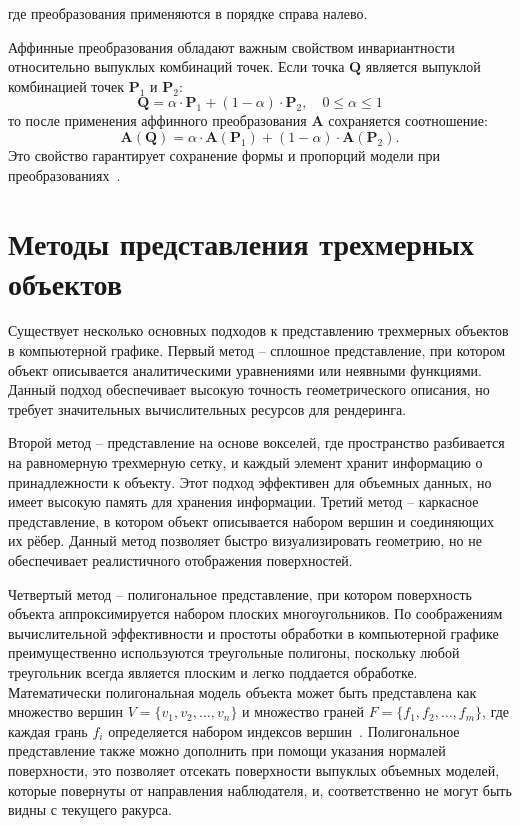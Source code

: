где преобразования применяются в порядке справа налево.

Аффинные преобразования обладают важным свойством инвариантности относительно выпуклых комбинаций точек. Если точка $\mathbf{Q}$ является выпуклой комбинацией точек $\mathbf{P}_1$ и $\mathbf{P}_2$:
\begin{equation}
	\mathbf{Q} = \alpha \cdot \mathbf{P}_1 + (1 - \alpha) \cdot \mathbf{P}_2, \quad 0 \leq \alpha \leq 1
\end{equation}
то после применения аффинного преобразования $\mathbf{A}$ сохраняется соотношение:
\begin{equation}
	\mathbf{A}(\mathbf{Q}) = \alpha \cdot \mathbf{A}(\mathbf{P}_1) + (1 - \alpha) \cdot \mathbf{A}(\mathbf{P}_2).
\end{equation}
Это свойство гарантирует сохранение формы и пропорций модели при преобразованиях~\cite{kaji}.

\section{Методы представления трехмерных объектов}
Существует несколько основных подходов к представлению трехмерных объектов в компьютерной графике. Первый метод -- сплошное представление, при котором объект описывается аналитическими уравнениями или неявными функциями. Данный подход обеспечивает высокую точность геометрического описания, но требует значительных вычислительных ресурсов для рендеринга.

Второй метод -- представление на основе вокселей, где пространство разбивается на равномерную трехмерную сетку, и каждый элемент хранит информацию о принадлежности к объекту. Этот подход эффективен для объемных данных, но имеет высокую память для хранения информации.
Третий метод -- каркасное представление, в котором объект описывается набором вершин и соединяющих их рёбер. Данный метод позволяет быстро визуализировать геометрию, но не обеспечивает реалистичного отображения поверхностей.

Четвертый метод -- полигональное представление, при котором поверхность объекта аппроксимируется набором плоских многоугольников. По соображениям вычислительной эффективности и простоты обработки в компьютерной графике преимущественно используются треугольные полигоны, поскольку любой треугольник всегда является плоским и легко поддается обработке. Математически полигональная модель объекта может быть представлена как множество вершин $V = \{v_1, v_2, \dots, v_n\}$ и множество граней $F = \{f_1, f_2, \dots, f_m\}$, где каждая грань $f_i$ определяется набором индексов вершин~\cite{rogers_mathematical}.
Полигональное представление также можно дополнить при помощи указания нормалей поверхности, это позволяет отсекать поверхности выпуклых объемных моделей, которые повернуты от направления наблюдателя, и, соответственно не могут быть видны с текущего ракурса.


